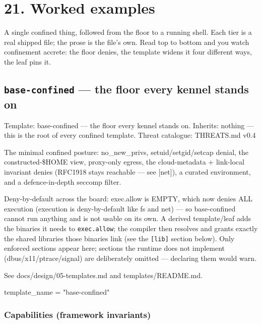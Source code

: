 \hypertarget{worked-examples}{%
\chapter{21. Worked examples}\label{worked-examples}}

A single confined thing, followed from the floor to a running shell.
Each tier is a real shipped file; the prose is the file's own. Read top
to bottom and you watch confinement accrete: the floor denies, the
template widens it four different ways, the leaf pins it.

\hypertarget{base-confined-the-floor-every-kennel-stands-on}{%
\section{\texorpdfstring{\texttt{base-confined} --- the floor every
kennel stands
on}{base-confined --- the floor every kennel stands on}}\label{base-confined-the-floor-every-kennel-stands-on}}

Template: base-confined --- the floor every kennel stands on. Inherits:
nothing --- this is the root of every confined template. Threat
catalogue: THREATS.md v0.4

The minimal confined posture: no\_new\_privs, setuid/setgid/setcap
denial, the constructed-\$HOME view, proxy-only egress, the
cloud-metadata + link-local invariant denies (RFC1918 stays reachable
--- see {[}net{]}), a curated environment, and a defence-in-depth
seccomp filter.

Deny-by-default across the board: exec.allow is EMPTY, which now denies
ALL execution (execution is deny-by-default like fs and net) --- so
base-confined cannot run anything and is not usable on its own. A
derived template/leaf adds the binaries it needs to \texttt{exec.allow};
the compiler then resolves and grants exactly the shared libraries those
binaries link (see the \texttt{{[}lib{]}} section below). Only enforced
sections appear here; sections the runtime does not implement
(dbus/x11/ptrace/signal) are deliberately omitted --- declaring them
would warn.

See docs/design/05-templates.md and templates/README.md.

\begin{kennelcode}
template_name = "base-confined"
\end{kennelcode}

\hypertarget{capabilities-framework-invariants}{%
\subsection{Capabilities (framework
invariants)}\label{capabilities-framework-invariants}}

